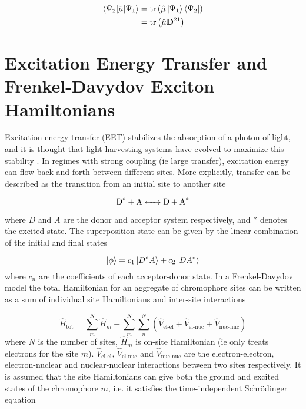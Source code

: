 \begin{equation}
\begin{split}    
\braket{\Psi_2|\hat{\mathbf{\mu}}|\Psi_1} &= \text{tr}\left(\hat{\mathbf{\mu}} \ket{\Psi_1} \bra{\Psi_2} \right) \\
&= \text{tr}\left( \hat{\mathbf{\mu}} \mathbf{D}^{21}\right)
\end{split}
\end{equation}
%
\section{Excitation Energy Transfer and Frenkel-Davydov Exciton Hamiltonians}
\label{sec:frenkel_exciton_theory}

Excitation energy transfer (EET) stabilizes the absorption of a photon of light,
and it is thought that light harvesting systems have evolved to maximize this stability \cite{Cleary2013}.
In regimes with strong coupling (ie large transfer), excitation energy can flow back
and forth between different sites. More explicitly, transfer can be described as
the transition from an initial site to another site

\begin{equation}
\ce{D^* + A <-> D + A^*}
\end{equation}

where $D$ and $A$ are the donor and acceptor system respectively, and $*$ denotes
the excited state. The superposition state can be given by the linear combination 
of the initial and final states

\begin{equation}
\ket{\phi} = c_1 \ket{D^*A} + c_2 \ket{DA^*}
\end{equation}
%
where $c_n$ are the coefficients of each acceptor-donor state. In a Frenkel-Davydov \cite{Frenkel1931, Davydov1964}
model the total Hamiltonian for an aggregate of chromophore sites can be written
as a sum of individual site Hamiltonians and inter-site interactions

\begin{equation}
\hat{H}_{\text{tot}} = \sum^N_m \hat{H}_m + \sum^N_m \sum^N_n \left(\hat{V}_{\text{el-el}} + \hat{V}_{\text{el-nuc}} + \hat{V}_{\text{nuc-nuc}}\right)
\end{equation}
%
where $N$ is the number of sites, $\hat{H}_m$ is on-site Hamiltonian (ie only treats
electrons for the site $m$). $\hat{V}_{\text{el-el}}$, $\hat{V}_{\text{el-nuc}}$ 
and $\hat{V}_{\text{nuc-nuc}}$ are the electron-electron, electron-nuclear and nuclear-nuclear
interactions between two sites respectively. It is assumed that the site Hamiltonians
can give both the ground and excited states of the chromophore $m$, i.e. it satisfies
the time-independent Schrödinger equation

